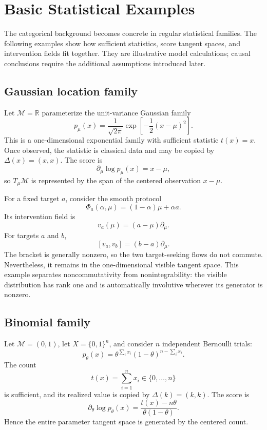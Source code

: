 \documentclass{article}
\theoremstyle{plain}
\theoremstyle{definition}
\theoremstyle{remark}
\newcommand{\R}{\mathbb R}
\newcommand{\M}{\mathcal M}
\begin{document}
\section{Basic Statistical Examples}
\label{sec:basic-examples}

The categorical background becomes concrete in regular statistical families.
The following examples show how sufficient statistics, score tangent spaces,
and intervention fields fit together.  They are illustrative model
calculations; causal conclusions require the additional assumptions introduced
later.

\subsection{Gaussian location family}

Let \(\M=\R\) parameterize the unit-variance Gaussian family
\[
  p_\mu(x)
  =
  \frac{1}{\sqrt{2\pi}}
  \exp\!\left[-\frac12(x-\mu)^2\right].
\]
This is a one-dimensional exponential family with sufficient statistic
\(t(x)=x\).  Once observed, the statistic is classical data and may be copied
by \(\Delta(x)=(x,x)\).  The score is
\[
  \partial_\mu\log p_\mu(x)=x-\mu,
\]
so \(T_\mu\M\) is represented by the span of the centered observation
\(x-\mu\).

For a fixed target \(a\), consider the smooth protocol
\[
  \Phi_a(\alpha,\mu)=(1-\alpha)\mu+\alpha a.
\]
Its intervention field is
\[
  v_a(\mu)=(a-\mu)\partial_\mu.
\]
For targets \(a\) and \(b\),
\[
  [v_a,v_b]=(b-a)\partial_\mu.
\]
The bracket is generally nonzero, so the two target-seeking flows do not
commute.  Nevertheless, it remains in the one-dimensional visible tangent
space.  This example separates noncommutativity from nonintegrability: the
visible distribution has rank one and is automatically involutive wherever its
generator is nonzero.

\subsection{Binomial family}

Let \(\M=(0,1)\), let \(X=\{0,1\}^n\), and consider \(n\) independent Bernoulli
trials:
\[
  p_\theta(x)
  =
  \theta^{\sum_i x_i}(1-\theta)^{n-\sum_i x_i}.
\]
The count
\[
  t(x)=\sum_{i=1}^n x_i\in\{0,\ldots,n\}
\]
is sufficient, and its realized value is copied by
\(\Delta(k)=(k,k)\).  The score is
\[
  \partial_\theta\log p_\theta(x)
  =
  \frac{t(x)-n\theta}{\theta(1-\theta)}.
\]
Hence the entire parameter tangent space is generated by the centered count.
\end{document}
